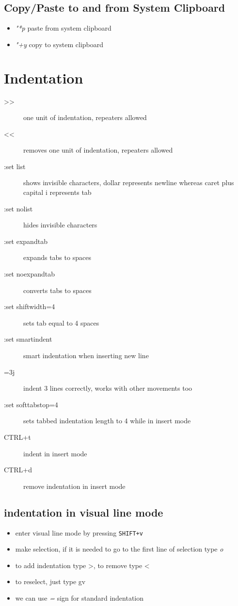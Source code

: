 \documentclass[a4paper, 12pt]{article}
\begin{document}
\subsection{Copy/Paste to and from System Clipboard}
\begin{itemize}
	\item \emph{"*p} paste from system clipboard
	\item \emph{"+y} copy to system clipboard
\end{itemize}

\section{Indentation}
\begin{description}
	\item[\textgreater\textgreater] one unit of indentation, repeaters allowed
	\item[\textless\textless] removes one unit of indentation, repeaters allowed
	\item[:set list] shows invisible characters, dollar represents newline whereas caret plus capital i represents tab
	\item[:set nolist] hides invisible characters
	\item[:set expandtab] expands tabs to spaces
	\item[:set noexpandtab] converts tabs to spaces
	\item[:set shiftwidth=4] sets tab equal to 4 spaces
	\item[:set smartindent] smart indentation when inserting new line
	\item[=3j] indent 3 lines correctly, works with other movements too
	\item[:set softtabstop=4] sets tabbed indentation length to 4 while in insert mode
	\item[CTRL+t] indent in insert mode
	\item[CTRL+d] remove indentation in insert mode
\end{description}

\subsection{indentation in visual line mode}
\begin{itemize}
	\item enter visual line mode by pressing \verb|SHIFT+v|
	\item make selection, if it is needed to go to the first line of selection type \emph{o}
	\item to add indentation type \textgreater, to remove type \textless
	\item to reselect, just type gv
	\item we can use \emph{=} sign for standard indentation
\end{itemize}
\end{document}
